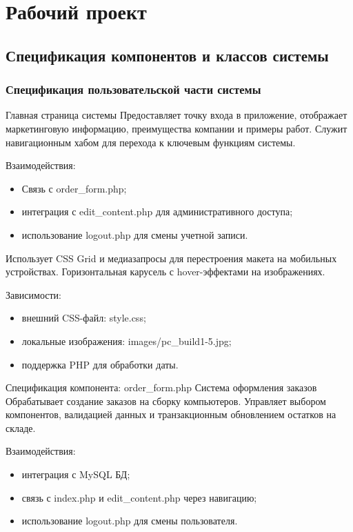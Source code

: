 \section{Рабочий проект}
\subsection{Спецификация компонентов и классов системы}
\subsubsection{Спецификация пользовательской части системы}
Главная страница системы
Предоставляет точку входа в приложение, отображает маркетинговую информацию, преимущества компании и примеры работ. Служит навигационным хабом для перехода к ключевым функциям системы.

Взаимодействия:
\begin{itemize}
	\item Связь с order\_form.php;
	\item интеграция с edit\_content.php для административного доступа;
	\item использование logout.php для смены учетной записи.
\end{itemize}

Использует CSS Grid и медиазапросы для перестроения макета на мобильных устройствах.
Горизонтальная карусель с hover-эффектами на изображениях.

Зависимости:
\begin{itemize}
\item внешний CSS-файл: style.css;
\item локальные изображения: images/pc\_build1-5.jpg;
\item поддержка PHP для обработки даты.
\end{itemize}

Спецификация компонента: order\_form.php
Система оформления заказов
Обрабатывает создание заказов на сборку компьютеров. Управляет выбором компонентов, валидацией данных и транзакционным обновлением остатков на складе. 

Взаимодействия:
\begin{itemize}
	\item интеграция с MySQL БД;
	\item связь с index.php и edit\_content.php через навигацию;
	\item использование logout.php для смены пользователя.
\end{itemize}

